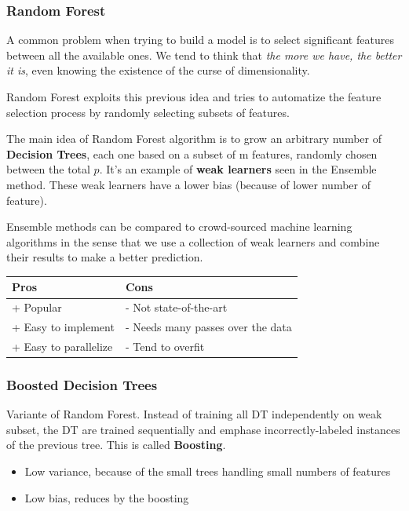 \subsubsection{Random Forest}

A common problem when trying to build a model is to select significant features between all the available ones. We tend to think that \textit{the more we have, the better it is}, even knowing the existence of the curse of dimensionality. 

Random Forest exploits this previous idea and tries to automatize the feature selection process by randomly selecting subsets of features.

The main idea of Random Forest algorithm is to grow an arbitrary number of \textbf{Decision Trees}, each one based on a subset of m features, randomly chosen between the total $p$. It's an example of \textbf{weak learners} seen in the Ensemble method. These weak learners have a lower bias (because of lower number of feature).

Ensemble methods can be compared to crowd-sourced machine learning algorithms in the sense that we use a collection of weak learners and combine their results to make a better prediction.

\begin{center} %
\begin{tabular} {| l | l |}
\hline
\bf Pros & \bf Cons \\ \hline
+ Popular & - Not state-of-the-art  \\
+ Easy to implement & - Needs many passes over the data \\
+ Easy to parallelize & - Tend to overfit \\ 
\hline
\end{tabular}
\end{center}

\subsubsection{Boosted Decision Trees}
Variante of Random Forest. Instead of training all DT independently on weak subset, the DT are trained sequentially and emphase incorrectly-labeled instances of the previous tree. This is called \textbf{Boosting}. 
\begin{itemize}
\item Low variance, because of the small trees handling small numbers of features
\item Low bias, reduces by the boosting
\end{itemize}

